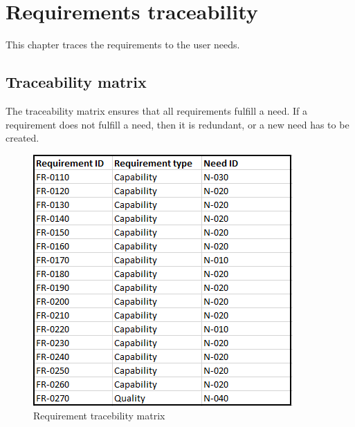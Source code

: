 \chapter{Requirements traceability}
This chapter traces the requirements to the user needs.

\section{Traceability matrix}
The traceability matrix ensures that all requirements fulfill a need. If a requirement does not fulfill a need, then it is redundant, or a new need has to be created.

\begin{figure}[H]
\centering

\includegraphics[scale=1]{Billeder/RTM.png}

\caption{Requirement tracebility matrix}
\label{RTM}
\end{figure}